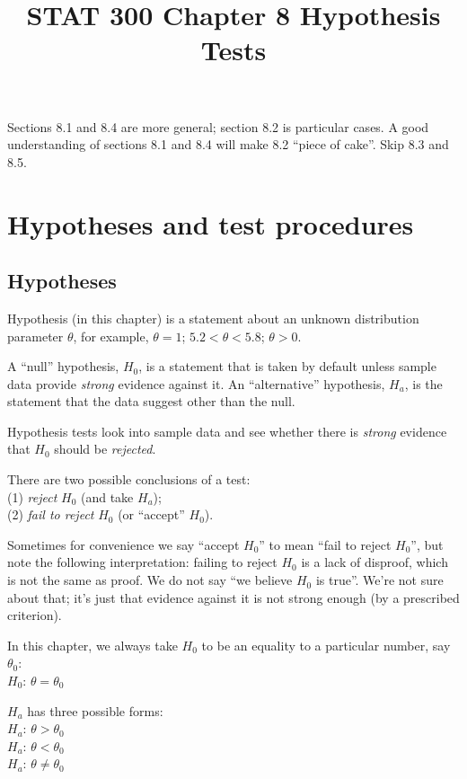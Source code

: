 \documentclass[12pt]{article}
\begin{document}
\title{STAT 300 Chapter 8 Hypothesis Tests}
\maketitle

Sections 8.1 and 8.4 are more general;
section 8.2 is particular cases.
A good understanding of sections 8.1 and 8.4
will make 8.2 ``piece of cake''.
Skip 8.3 and 8.5.


\section{Hypotheses and test procedures}

\subsection{Hypotheses}

Hypothesis (in this chapter) is a statement about an
unknown distribution parameter $\theta$, for example,
$\theta = 1$; $5.2 < \theta < 5.8$; $\theta > 0$.

A ``null'' hypothesis, $H_0$,
is a statement that is taken by default unless
sample data provide \emph{strong} evidence against it.
An ``alternative'' hypothesis, $H_a$, is the statement that the data
suggest other than the null.

Hypothesis tests look into sample data and see whether there is
\emph{strong} evidence that $H_0$ should be \emph{rejected}.

There are two possible conclusions of a test:\\
(1) \emph{reject} $H_0$ (and take $H_a$);\\
(2) \emph{fail to reject} $H_0$ (or ``accept'' $H_0$).

Sometimes for convenience we say ``accept $H_0$'' to mean
``fail to reject $H_0$'', but note the following interpretation:
failing to reject $H_0$
is a lack of disproof, which is not the same as proof.
We do not say ``we believe $H_0$ is true''.
We're not sure about that; it's just that evidence against it is not
strong enough (by a prescribed criterion).

In this chapter, we always take $H_0$ to be an equality to
a particular number, say $\theta_0$:\\
$H_0$: $\theta = \theta_0$

$H_a$ has three possible forms:\\
$H_a$: $\theta > \theta_0$\\
$H_a$: $\theta < \theta_0$\\
$H_a$: $\theta \ne \theta_0$
\end{document}
